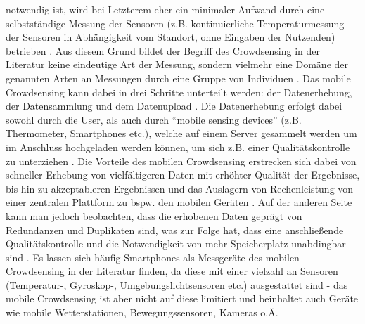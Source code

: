 notwendig ist, wird bei Letzterem eher ein minimaler Aufwand durch eine selbstständige Messung der Sensoren (z.B. kontinuierliche Temperaturmessung der Sensoren in Abhängigkeit vom Standort, ohne Eingaben der 
Nutzenden) betrieben \cite{Ganti2011}. Aus diesem Grund bildet der Begriff des Crowdsensing in der Literatur keine eindeutige Art der Messung, sondern vielmehr eine Domäne der genannten Arten an Messungen durch 
eine Gruppe von Individuen \cite{Ganti2011}. \newline Das mobile Crowdsensing kann dabei in drei Schritte unterteilt werden: der Datenerhebung, der Datensammlung und dem Datenupload \cite{Ray2022}. Die Datenerhebung erfolgt dabei 
sowohl durch die User, als auch durch \enquote{mobile sensing devices} (z.B. Thermometer, Smartphones etc.), welche auf einem Server gesammelt werden um im Anschluss hochgeladen werden können, um sich z.B. einer Qualitätskontrolle zu 
unterziehen \cite{Ray2022}. Die Vorteile des mobilen Crowdsensing erstrecken sich dabei von schneller Erhebung von vielfältigeren Daten mit erhöhter Qualität der Ergebnisse, bis hin zu akzeptableren Ergebnissen und das Auslagern von Rechenleistung 
von einer zentralen Plattform zu bspw. den mobilen Geräten \cite{Ray2022}. Auf der anderen Seite kann man jedoch beobachten, dass die erhobenen Daten geprägt von Redundanzen und Duplikaten sind, was zur Folge hat, dass eine 
anschließende Qualitätskontrolle und die Notwendigkeit von mehr Speicherplatz unabdingbar sind \cite{Ray2022}. Es lassen sich häufig Smartphones als Messgeräte des mobilen Crowdsensing in der Literatur finden, da diese mit einer vielzahl 
an Sensoren (Temperatur-, Gyroskop-, Umgebungslichtsensoren etc.) ausgestattet sind - das mobile Crowdsensing ist aber nicht auf diese limitiert und beinhaltet auch Geräte wie mobile Wetterstationen, Bewegungssensoren, Kameras o.Ä. 

